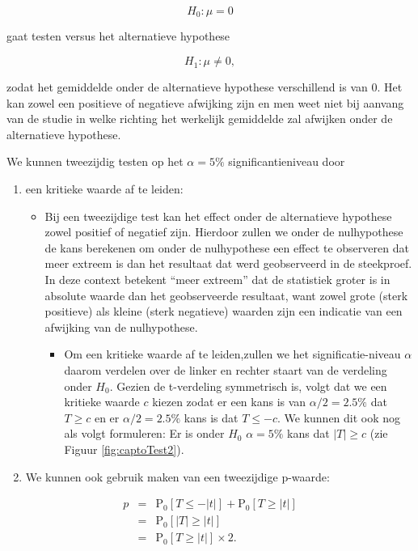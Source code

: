 \documentclass[
  12pt,dutch,coursenotes]{book}
\providecommand{\tightlist}{%
  \setlength{\itemsep}{0pt}\setlength{\parskip}{0pt}}
\begin{document}
\[H_0: \mu=0\]

gaat testen versus het alternatieve hypothese

\[H_1: \mu\neq0,\]

zodat het gemiddelde onder de alternatieve hypothese verschillend is van \(0\). Het kan zowel een positieve of negatieve afwijking zijn en men weet niet bij aanvang van de studie in welke richting het werkelijk gemiddelde zal afwijken onder de alternatieve hypothese.

We kunnen tweezijdig testen op het \(\alpha=5\%\) significantieniveau door

\begin{enumerate}
\def\labelenumi{\arabic{enumi}.}
\tightlist
\item
  een kritieke waarde af te leiden:

  \begin{itemize}
  \tightlist
  \item
    Bij een tweezijdige test kan het effect onder de alternatieve hypothese zowel positief of negatief zijn. Hierdoor zullen we onder de nulhypothese de kans berekenen om onder de nulhypothese een effect te observeren dat meer extreem is dan het resultaat dat werd geobserveerd in de steekproef. In deze context betekent ``meer extreem'' dat de statistiek groter is in absolute waarde dan het geobserveerde resultaat, want zowel grote (sterk positieve) als kleine (sterk negatieve) waarden zijn een indicatie van een afwijking van de nulhypothese.

    \begin{itemize}
    \tightlist
    \item
      Om een kritieke waarde af te leiden,zullen we het significatie-niveau \(\alpha\) daarom verdelen over de linker en rechter staart van de verdeling onder \(H_0\). Gezien de t-verdeling symmetrisch is, volgt dat we een kritieke waarde \(c\) kiezen zodat er een kans is van \(\alpha/2=2.5\%\) dat \(T\geq c\) en er \(\alpha/2=2.5\%\) kans is dat \(T\leq -c\). We kunnen dit ook nog als volgt formuleren: Er is onder \(H_0\) \(\alpha=5\%\) kans dat \(\vert T\vert\geq c\) (zie Figuur \ref{fig:captoTest2}).
    \end{itemize}
  \end{itemize}
\item
  We kunnen ook gebruik maken van een tweezijdige p-waarde:
\end{enumerate}

\begin{eqnarray*}
  p&=&\text{P}_0\left[T\leq -|t|\right] + \text{P}_0\left[T\geq |t|\right]\\
  &=&\text{P}_0\left[\vert T\vert \geq \vert t \vert\right]\\
  &=&\text{P}_0\left[T \geq \vert t \vert\right]\times 2.
\end{eqnarray*}
\end{document}
